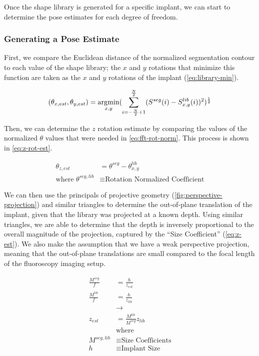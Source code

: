 Once the shape library is generated for a specific implant, we can start to determine the pose estimates for each degree of freedom.

\subsubsection{Generating a Pose Estimate}
First, we compare the Euclidean distance of the normalized segmentation contour to each value of the shape library; the $x$ and $y$ rotations that minimize this function are taken as the $x$ and $y$ rotations of the implant (\cref{eq:library-min}).

\begin{equation}
    (\theta_{x,est},\theta_{y,est}) = \operatorname*{\arg\!min}_{x,y}(\sum_{i = -\frac{N}{2} + 1}^{\frac{N}{2}}(S^{seg}(i) - S^{lib}_{x,y}(i))^2)^{\frac{1}{2}}
    \label{eq:library-min}
\end{equation}

Then, we can determine the $z$ rotation estimate by comparing the values of the normalized $\theta$ values that were needed in \cref{eq:fft-rot-norm}. This process is shown in \cref{eq:z-rot-est}.

\begin{equation}
    \begin{aligned}
        \theta_{z,est} &= \theta^{seg} - \theta^{lib}_{x,y}\\
        \text{where } \theta^{seg,lib} &\equiv \text{Rotation Normalized Coefficient}
    \end{aligned}
\label{eq:z-rot-est}
\end{equation}

We can then use the principals of projective geometry (\cref{fig:perspective-projection}) and similar triangles to determine the out-of-plane translation of the implant, given that the library was projected at a known depth. Using similar triangles, we are able to determine that the depth is inversely proportional to the overall magnitude of the projection, captured by the ``Size Coefficient'' (\cref{eq:z-est}). We also make the assumption that we have a weak perspective projection, meaning that the out-of-plane translations are small compared to the focal length of the fluoroscopy imaging setup.

\begin{equation}
    \begin{aligned}
        \frac{M^{seg}}{f} &= \frac{h}{z_{est}}\\
        \frac{M^{lib}}{f} &= \frac{h}{z_{lib}}\\
        & \rightarrow \\
        z_{est}& = \frac{M^{lib}}{M^{seg}}z_{lib} \\
        &\text{where }\\
        M^{seg,lib} &\equiv \text{Size Coefficients} \\
        h &\equiv \text{Implant Size}
    \end{aligned}
    \label{eq:z-est}
\end{equation}

